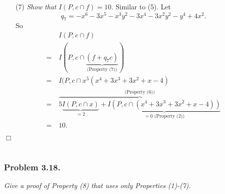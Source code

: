 \documentclass{article}
\begin{document}
\begin{enumerate}
\item[(7)]
  \emph{Show that $I(P, c \cap f) = 10$.}
  Similar to (5).
  Let
  \[
    q_7 = -x^6 -3x^5-x^3y^2 -3x^4-3x^2y^2-y^4 + 4x^2.
  \]
  So
  \begin{align*}
    & \: I(P, c \cap f) \\
    =& \: I(P,
      c \cap \underbrace{(f + q_7 c)}_{\text{(Property (7))}}) \\
    =& \: I(P, c \cap x^5(x^4+3x^3+3x^2+x-4) \\
    =& \: \overbrace{5 \underbrace{I(P, c \cap x)}_{= 2}
      + \underbrace{I(P, c \cap (x^4+3x^3+3x^2+x-4))}_{
        = 0 \text{ (Property (2))}}}^{\text{(Property (6)})} \\
    =& \: 10.
  \end{align*}
\end{enumerate}
$\Box$ \\\\






\subsubsection*{Problem 3.18.}
\emph{Give a proof of Property (8) that uses only Properties (1)-(7).} \\
\end{document}
